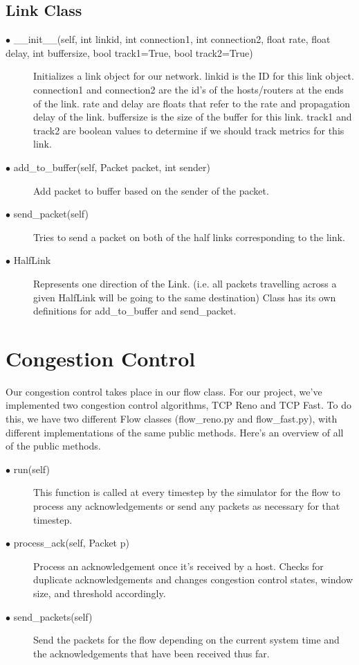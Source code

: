 \documentclass{article}
\begin{document}
\subsection{Link Class}
\begin{description}
	\item [$\bullet$ \_\_init\_\_(self, int linkid, int connection1, int connection2, float rate, float delay, int buffersize, bool track1=True, bool track2=True)] Initializes a link object for our network. linkid is the ID for this link object. connection1 and connection2 are the id's of the hosts/routers at the ends of the link. rate and delay are floats that refer to the rate and propagation delay of the link. buffersize is the size of the buffer for this link. track1 and track2 are boolean values to determine if we should track metrics for this link. 
	\item [$\bullet$ add\_to\_buffer(self, Packet packet, int sender)] Add packet to buffer based on the sender of the packet.
	\item [$\bullet$ send\_packet(self)] Tries to send a packet on both of the half links corresponding to the link.
	\item [$\bullet$ HalfLink] Represents one direction of the Link. (i.e. all packets travelling across a given HalfLink will be going to the same destination) Class has its own definitions for add\_to\_buffer and send\_packet.
	
\end{description}

\section{Congestion Control}

Our congestion control takes place in our flow class. For our project, we've implemented two congestion control algorithms, TCP Reno and TCP Fast. To do this, we have two different Flow classes (flow\_reno.py and flow\_fast.py), with different implementations of the same public methods. Here's an overview of all of the public methods. 

\begin{description}
	\item [$\bullet$ run(self)] This function is called at every timestep by the simulator for the flow to process any acknowledgements or send any packets as necessary for that timestep.
	\item [$\bullet$ process\_ack(self, Packet p)] Process an acknowledgement once it's received by a host. Checks for duplicate acknowledgements and changes congestion control states, window size, and threshold accordingly.
	\item [$\bullet$ send\_packets(self)] Send the packets for the flow depending on the current system time and the acknowledgements that have been received thus far.
\end{description}
\end{document}
